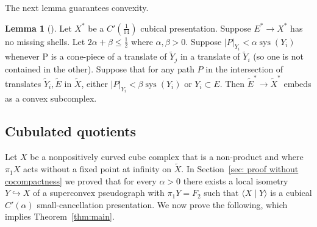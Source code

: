 \documentclass[12pt,oneside]{amsart}
\theoremstyle{definition}
\newtheorem{lem}[thm]{Lemma}
\theoremstyle{definition}
\theoremstyle{remark}
\DeclareMathOperator{\sys}{\mathrm sys}
\begin{document}
The next lemma guarantees convexity. 
\begin{lem}[{\cite[Lem~3.74]{WiseBook}}]\label{lem:convexity of induced}
    Let $X^*$ be a $C'(\frac{1}{14})$ cubical presentation. Suppose $E^* \to X^*$ has no missing shells.
    Let $2\alpha+\beta\leq \frac12$ where $\alpha,\beta>0$. Suppose $|P|_{Y_i} <\alpha \sys(Y_i)$ whenever P is a cone-piece of a translate of $\widetilde Y_j$ in a translate of $\widetilde Y_i$ (so one is not contained in the other).
    Suppose that for any path $P$ in the intersection of translates $\widetilde Y_i,\widetilde E$ in $\widetilde X$, either $|P|_{Y_i} <\beta\sys(Y_i)$ or $Y_i  \subset E$.
    Then $\widetilde E^* \rightarrow \widetilde X^*$ embeds as a convex subcomplex.
\end{lem}



\subsection{Cubulated quotients}
Let $X$ be a nonpositively curved cube complex that is a non-product and where $\pi_1X$ acts without a fixed point at infinity on $\widetilde X$. In Section~\ref{sec: proof without cocompactness} we proved that for every $\alpha>0$ there exists a local isometry $Y\hookrightarrow X$ of a superconvex pseudograph with $\pi_1 Y=  F_2$ such that $\langle X\mid Y\rangle$ is a cubical $C'(\alpha)$ small-cancellation presentation.  We now prove the following, which implies Theorem~\ref{thm:main}. 
\end{document}
